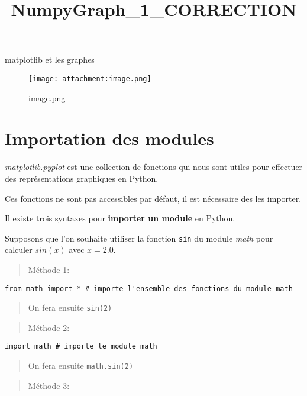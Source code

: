 \documentclass[11pt]{article}
\title{NumpyGraph\_1\_CORRECTION}
\begin{document}
    
    \maketitle
    
    

    
     matplotlib et les graphes

\begin{figure}
\centering
\texttt{[image: attachment:image.png]}
\caption{image.png}
\end{figure}

    \hypertarget{importation-des-modules}{%
\section{Importation des modules}\label{importation-des-modules}}

\emph{matplotlib.pyplot} est une collection de fonctions qui nous sont
utiles pour effectuer des représentations graphiques en Python.

Ces fonctions ne sont pas accessibles par défaut, il est nécessaire des
les importer.

Il existe trois syntaxes pour \textbf{importer un module} en Python.

Supposons que l'on souhaite utiliser la fonction \texttt{sin} du module
\emph{math} pour calculer \(sin(x)\) avec \(x=2.0\).

\begin{quote}
Méthode 1:
\end{quote}

\begin{verbatim}
from math import * # importe l'ensemble des fonctions du module math
\end{verbatim}

\begin{quote}
On fera ensuite \texttt{sin(2)}
\end{quote}

\begin{quote}
Méthode 2:
\end{quote}

\begin{verbatim}
import math # importe le module math
\end{verbatim}

\begin{quote}
On fera ensuite \texttt{math.sin(2)}
\end{quote}

\begin{quote}
Méthode 3:
\end{quote}
\end{document}
